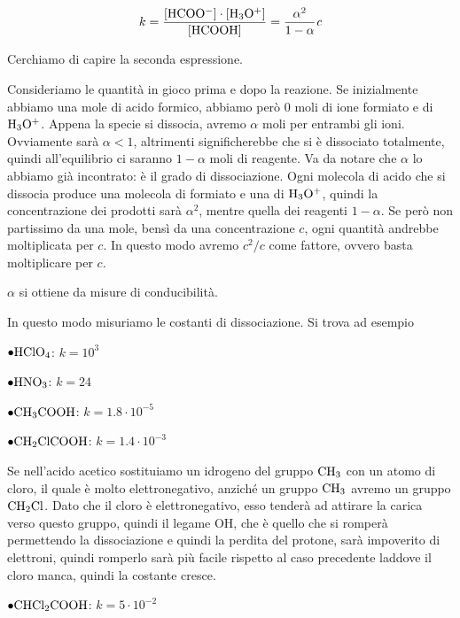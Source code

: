 $$k= \rm{\frac{[HCOO^-]\cdot[H_3O^+]}{[HCOOH]}} = \frac{\alpha^2}{1- \alpha}\textit{c}$$

Cerchiamo di capire la seconda espressione.

Consideriamo le quantità in gioco prima e dopo la reazione. Se inizialmente abbiamo una mole di acido formico, abbiamo però 0 moli di ione formiato e di $\rm H_3O^+$. Appena la specie si dissocia, avremo $\alpha$ moli per entrambi gli ioni. Ovviamente sarà $\alpha<1$, altrimenti significherebbe che si è dissociato totalmente, quindi all'equilibrio ci saranno $1-\alpha$ moli di reagente. Va da notare che $\alpha$ lo abbiamo già incontrato: è il grado di dissociazione. Ogni molecola di acido che si dissocia produce una molecola di formiato e una di $\rm H_3O^+$, quindi la concentrazione dei prodotti sarà $\alpha^2$, mentre quella dei reagenti $1-\alpha$. Se però non partissimo da una mole, bensì da una concentrazione $c$, ogni quantità andrebbe moltiplicata per $c$. In questo modo avremo $c^2/c$ come fattore, ovvero basta moltiplicare per $c$.

$\alpha$ si ottiene da misure di conducibilità.

In questo modo misuriamo le costanti di dissociazione. Si trova ad esempio

\vspace{0.2cm}$\bullet \rm HClO_4$: $k=10^3$

\vspace{0.2cm}$\bullet \rm HNO_3$: $k=24$

\vspace{0.2cm}$\bullet \rm CH_3COOH$: $k=1.8 \cdot 10^{-5}$

\vspace{0.2cm}$\bullet \rm CH_2ClCOOH$: $k=1.4 \cdot 10^{-3}$

\vspace{0.2cm}Se nell'acido acetico sostituiamo un idrogeno del gruppo $\rm CH_3$ con un atomo di cloro, il quale è molto elettronegativo, anziché un gruppo $\rm CH_3$ avremo un gruppo $\rm CH_2Cl$. Dato che il cloro è elettronegativo, esso tenderà ad attirare la carica verso questo gruppo, quindi il legame OH, che è quello che si romperà permettendo la dissociazione e quindi la perdita del protone, sarà impoverito di elettroni, quindi romperlo sarà più facile rispetto al caso precedente laddove il cloro manca, quindi la costante cresce.

\vspace{0.2cm}$\bullet \rm CHCl_2COOH$: $k=5 \cdot 10^{-2}$

